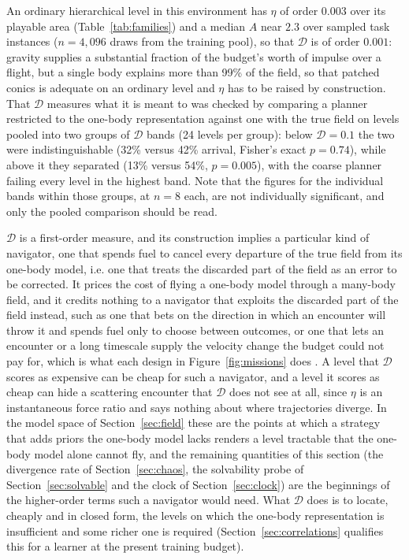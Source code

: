 \documentclass[11pt]{article}
\newcommand{\dd}{\mathcal{D}}
\begin{document}
An ordinary hierarchical level in this environment has $\eta$ of order
$0.003$ over its playable area (Table~\ref{tab:families}) and a median $A$
near $2.3$ over sampled task instances ($n = 4{,}096$ draws from the
training pool), so that $\dd$ is of order $0.001$: gravity supplies a
substantial fraction of the budget's worth of impulse over a flight, but a
single body explains more than 99\% of the field, so that patched conics is
adequate on an ordinary level and $\eta$ has to be raised by construction. That $\dd$
measures what it is meant to was checked by comparing a planner restricted
to the one-body representation against one with the true field on levels
pooled into two groups of $\dd$ bands (24 levels per group): below $\dd = 0.1$ the
two were indistinguishable (32\% versus 42\% arrival, Fisher's exact
$p = 0.74$), while above it they separated (13\% versus 54\%, $p = 0.005$),
with the coarse planner failing every level in the highest band. Note that
the figures for the individual bands within those groups, at $n = 8$ each,
are not individually significant, and only the pooled comparison should be
read.

$\dd$ is a first-order measure, and its construction implies a particular
kind of navigator, one that spends fuel to cancel every departure of the
true field from its one-body model, i.e. one that treats the discarded part
of the field as an error to be corrected. It prices the cost of flying a
one-body model through a many-body field, and it credits nothing to a
navigator that exploits the discarded part of the field instead, such as one
that bets on the direction in which an encounter will throw it and spends
fuel only to choose between outcomes, or one that lets an encounter or a
long timescale supply the velocity change the budget could not pay for,
which is what each design in Figure~\ref{fig:missions} does
\cite{belbruno1993,koon2000}. A level that $\dd$ scores as
expensive can be cheap for such a navigator, and a level it scores as cheap
can hide a scattering encounter that $\dd$ does not see at all, since $\eta$
is an instantaneous force ratio and says nothing about where trajectories
diverge. In the model space of Section~\ref{sec:field} these are the points
at which a strategy that adds priors the one-body model lacks renders a
level tractable that the one-body model alone cannot fly, and the remaining
quantities of this section (the divergence rate of Section~\ref{sec:chaos},
the solvability probe of Section~\ref{sec:solvable} and the clock of
Section~\ref{sec:clock}) are the beginnings of the higher-order terms such a
navigator would need. What $\dd$ does is to locate, cheaply and in closed
form, the levels on which the one-body representation is insufficient and
some richer one is required (Section~\ref{sec:correlations} qualifies this
for a learner at the present training budget).
\end{document}
